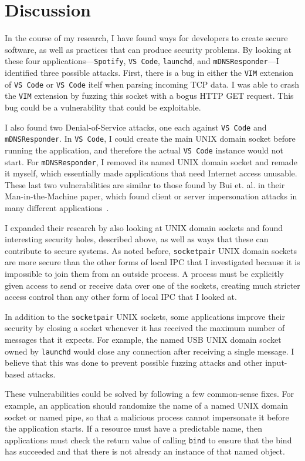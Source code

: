 \chapter{Discussion}
\label{sec:discussion}
In the course of my research, I have found ways for developers to create secure software, as well as practices that can produce security problems.  By looking at these four applications---\texttt{Spotify}, \texttt{VS Code}, \texttt{launchd}, and \texttt{mDNSResponder}---I identified three possible attacks.  First, there is a bug in either the \texttt{VIM} extension of \texttt{VS Code} or \texttt{VS Code} itelf when parsing incoming TCP data.  I was able to crash the \texttt{VIM} extension by fuzzing this socket with a bogus HTTP GET request.  This bug could be a vulnerability that could be exploitable.

I also found two Denial-of-Service attacks, one each against \texttt{VS Code} and \texttt{mDNSResponder}.  In \texttt{VS Code}, I could create the main UNIX domain socket before running the application, and therefore the actual \texttt{VS Code} instance would not start.  For \texttt{mDNSResponder}, I removed its named UNIX domain socket and remade it myself, which essentially made applications that need Internet access unusable.  These last two vulnerabilities are similar to those found by Bui et. al. in their Man-in-the-Machine paper, which found client or server impersonation attacks in many different applications~\cite{MitMa}.

I expanded their research by also looking at UNIX domain sockets and found interesting security holes, described above, as well as ways that these can contribute to secure systems.  As noted before, \texttt{socketpair} UNIX domain sockets are more secure than the other forms of local IPC that I investigated because it is impossible to join them from an outside process.  A process must be explicitly given access to send or receive data over one of the sockets, creating much stricter access control than any other form of local IPC that I looked at.

In addition to the \texttt{socketpair} UNIX sockets, some applications improve their security by closing a socket whenever it has received the maximum number of messages that it expects.  For example, the named USB UNIX domain socket owned by \texttt{launchd} would close any connection after receiving a single message.  I believe that this was done to prevent possible fuzzing attacks and other input-based attacks.

These vulnerabilities could be solved by following a few common-sense fixes.  For example, an application should randomize the name of a named UNIX domain socket or named pipe, so that a malicious process cannot impersonate it before the application starts.  If a resource must have a predictable name, then applications must check the return value of calling \texttt{bind} to ensure that the bind has succeeded and that there is not already an instance of that named object.

